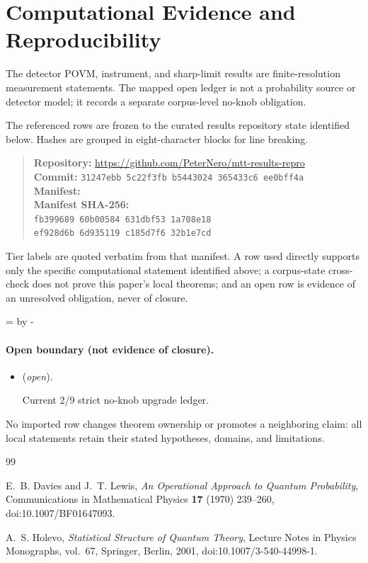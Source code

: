 \documentclass[11pt]{article}
\begin{document}
\section*{Computational Evidence and Reproducibility}
The detector POVM, instrument, and sharp-limit results are finite-resolution measurement statements. The mapped open ledger is not a probability source or detector model; it records a separate corpus-level no-knob obligation.

The referenced rows are frozen to the curated results repository state identified below. Hashes are grouped in eight-character blocks for line breaking.
\begin{quote}\small
\textbf{Repository:} \url{https://github.com/PeterNero/mtt-results-repro}\\
\textbf{Commit:} \texttt{31247ebb 5c22f3fb b5443024 365433c6 ee0bff4a}\\
\textbf{Manifest:} \\
\textbf{Manifest SHA-256:}\\
\texttt{fb399689 60b00584 631dbf53 1a708e18}\\
\texttt{ef928d6b 6d935119 c185d7f6 32b1e7cd}
\end{quote}

Tier labels are quoted verbatim from that manifest. A row used directly supports only the specific computational statement identified above; a corpus-state cross-check does not prove this paper's local theorems; and an open row is evidence of an unresolved obligation, never of closure.

\par\begingroup{}=\pagegoal\advance{} by -\pagetotal\ifdim\dimen0<7\baselineskip\newpage\fi\endgroup
\paragraph{Open boundary (not evidence of closure).}
\begin{itemize}
\setlength{\itemsep}{0.25em}
\item {} (\emph{open}).\par Current 2/9 strict no-knob upgrade ledger.
\end{itemize}

No imported row changes theorem ownership or promotes a neighboring claim: all local statements retain their stated hypotheses, domains, and limitations.

\begin{thebibliography}{99}

E.~B. Davies and J.~T. Lewis,
\emph{An Operational Approach to Quantum Probability},
Communications in Mathematical Physics \textbf{17} (1970) 239--260,
doi:10.1007/BF01647093.

A.~S. Holevo,
\emph{Statistical Structure of Quantum Theory},
Lecture Notes in Physics Monographs, vol.~67,
Springer, Berlin, 2001,
doi:10.1007/3-540-44998-1.

\end{thebibliography}
\end{document}
